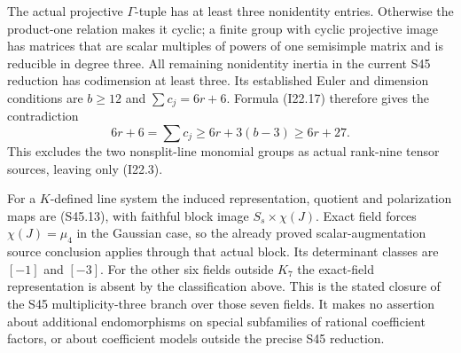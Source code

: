The actual projective $\Gamma$-tuple has at least three
nonidentity entries. Otherwise the product-one relation
makes it cyclic; a finite group with cyclic projective
image has matrices that are scalar multiples of powers
of one semisimple matrix and is reducible in degree three.
All remaining nonidentity inertia in the current S45
reduction has codimension at least three. Its established
Euler and dimension conditions are
$b\ge12$ and $\sum c_j=6r+6$. Formula (I22.17) therefore
gives the contradiction
\[
             6r+6=\sum c_j\ge6r+3(b-3)\ge6r+27.           \tag{I22.18}
\]
This excludes the two nonsplit-line monomial groups as
actual rank-nine tensor sources, leaving only (I22.3).

For a $K$-defined line system the induced representation,
quotient and polarization maps are (S45.13), with faithful
block image $S_s\times\chi(J)$. Exact field forces
$\chi(J)=\mu_4$ in the Gaussian case, so the already proved
scalar-augmentation source conclusion applies through that
actual block. Its determinant classes are $[-1]$ and $[-3]$.
For the other six fields outside $K_7$ the exact-field
representation is absent by the classification above.
This is the stated closure of the S45 multiplicity-three
branch over those seven fields. It makes no assertion about
additional endomorphisms on special subfamilies of rational
coefficient factors, or about coefficient models outside
the precise S45 reduction.
